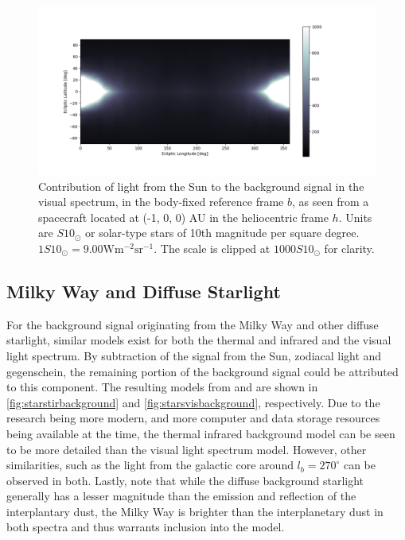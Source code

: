 \begin{figure}[htbp]
 \centering
 \includegraphics[width=1.0\textwidth]{img/background_vis_zodiac.png}
 \caption{Contribution of light from the Sun to the background signal in the visual spectrum, in the body-fixed reference frame $b$, as seen from a spacecraft located at (-1, 0, 0) AU in the heliocentric frame $h$. Units are $S10_\odot$ or solar-type stars of 10th magnitude per square degree. $1S10_\odot = 9.00\mathrm{W}\mathrm{m}^{-2}\mathrm{sr}^{-1}$. The scale is clipped at $1000 S10_\odot$ for clarity.}
 \label{fig:solarvisbackground}
\end{figure}


\subsection{Milky Way and Diffuse Starlight}

For the background signal originating from the Milky Way and other diffuse starlight, similar models exist for both the thermal and infrared and the visual light spectrum. By subtraction of the signal from the Sun, zodiacal light and gegenschein, the remaining portion of the background signal could be attributed to this component. The resulting models from \cite{IRDust} and \cite{LightOfTheNightSky} are shown in \autoref{fig:starstirbackground} and \autoref{fig:starsvisbackground}, respectively. Due to the research being more modern, and more computer and data storage resources being available at the time, the thermal infrared background model can be seen to be more detailed than the visual light spectrum model. However, other similarities, such as the light from the galactic core around $l_b = 270^\circ$ can be observed in both. Lastly, note that while the diffuse background starlight generally has a lesser magnitude than the emission and reflection of the interplantary dust, the Milky Way is brighter than the interplanetary dust in both spectra and thus warrants inclusion into the model. \\


